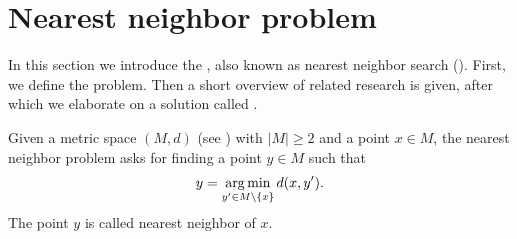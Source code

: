 \section{Nearest neighbor problem}\label{nearestNeighborProblem}
	In this section we introduce the \nearestNeighborProblem, also known as nearest neighbor search (\nns).
	First, we define the problem. Then a short overview of related research is given, after which we elaborate on
	a solution called {\coverTree} .
	\begin{mydef}
		Given a metric space $(M, d)$ (see ) with $|M| \ge 2$ and a point $x \in M$,
		the \textnormal{nearest neighbor problem} asks for finding a point $y \in M$ such that
		\begin{align*}
			y = \operatorname*{arg\,min}_{y' \in M \setminus \{x\}} d(x, y').
		\end{align*}
		The point $y$ is called \textnormal{nearest neighbor} of $x$.
	\end{mydef}
